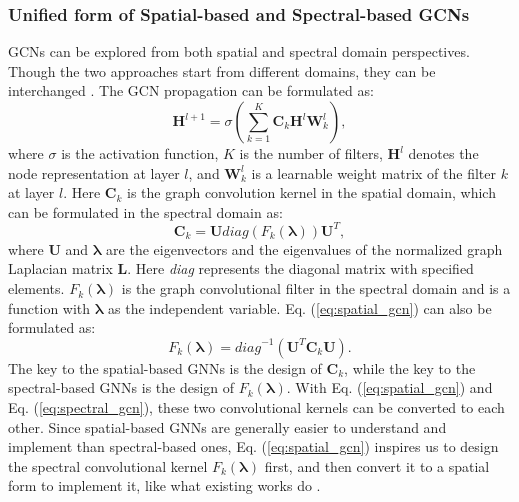 \documentclass[letterpaper]{article} %
\newcommand{\suhang}[1]{\textcolor{blue}{SW: #1}}
\begin{document}
\subsubsection{Unified form of Spatial-based and Spectral-based GCNs}
GCNs can be explored from both spatial and spectral domain perspectives. Though the two approaches start from different domains, they can be interchanged \cite{balcilar2020bridging}. The GCN propagation can be formulated as:
\begin{equation}
\mathbf{H}^{l+1}=\sigma(\sum_{k=1}^{K}\mathbf{C}_{k}\mathbf{H}^{l}\mathbf{W}^{l}_{k}),
\end{equation}
where $\sigma$ is the activation function, $K$ is the number of filters, $\mathbf{H}^{l}$ denotes the node representation at layer $l$, and $\mathbf{W}^{l}_{k}$ is a learnable weight matrix of the filter $k$ at layer $l$. Here $\mathbf{C}_{k}$ is the graph convolution kernel in the spatial domain, which can be formulated in the spectral domain as:
\begin{equation}
    \mathbf{C}_{k}=\mathbf{U}\textit{diag}(F_{k}(\mathbf{\mathbf{\lambda}}))\mathbf{U}^T,
    \label{eq:spatial_gcn}
\end{equation}
where $\mathbf{U}$ and $\mathbf{\lambda}$ are the eigenvectors and the eigenvalues of the normalized graph Laplacian matrix $\mathbf{L}$. Here \textit{diag} represents the diagonal matrix with specified elements. $F_{k}(\mathbf{\lambda})$ is the graph convolutional filter in the spectral domain and is a function with $\mathbf{\lambda}$ as the independent variable. Eq. (\ref{eq:spatial_gcn}) can also be formulated as:%
\begin{equation}
    F_{k}(\mathbf{\lambda}) = \textit{diag}^{-1}(\mathbf{U}^T\mathbf{C}_{k}\mathbf{U}).
    \label{eq:spectral_gcn}
\end{equation}
The key to the spatial-based GNNs is the design of $\mathbf{C}_{k}$, while the key to the spectral-based GNNs is the design of $F_{k}(\mathbf{\lambda})$. With Eq. (\ref{eq:spatial_gcn}) and Eq. (\ref{eq:spectral_gcn}), these two convolutional kernels can be converted to each other. Since spatial-based GNNs are generally easier to understand and implement than spectral-based ones, Eq. (\ref{eq:spatial_gcn}) inspires us to design the spectral convolutional kernel $F_{k}(\mathbf{\lambda})$ first, and then convert it to a spatial form to implement it, like what existing works do \cite{kipf2016semi, wu2022beyond}.
\end{document}
